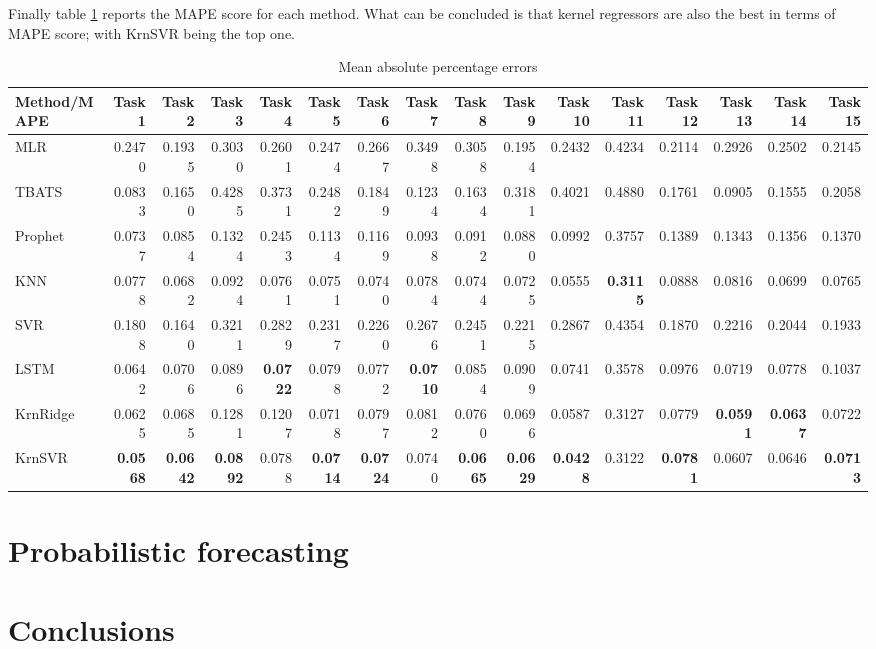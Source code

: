 Finally table \ref{tab:point_MAPE} reports the MAPE score for each method. What can be concluded is that kernel regressors are also the best in terms of MAPE score; with KrnSVR being the top one.
\begin{table}[!ht]
    \caption{Mean absolute percentage errors}
    \label{tab:point_MAPE}
    \begin{adjustbox}{width=\textwidth}
        \begin{tabular}{lrrrrrrrrrrrrrrr}
            \toprule
             Method/MAPE & Task 1 & Task 2 & Task 3 & Task 4 & Task 5 & Task 6 & Task 7 & Task 8 & Task 9 & Task 10 & Task 11 & Task 12 & Task 13 & Task 14 & Task 15 \\
            \midrule
            MLR & 0.2470 & 0.1935 & 0.3030 & 0.2601 & 0.2474 & 0.2667 & 0.3498 & 0.3058 & 0.1954 & 0.2432 & 0.4234 & 0.2114 & 0.2926 & 0.2502 & 0.2145 \\
            TBATS & 0.0833 & 0.1650 & 0.4285 & 0.3731 & 0.2482 & 0.1849 & 0.1234 & 0.1634 & 0.3181 & 0.4021 & 0.4880 & 0.1761 & 0.0905 & 0.1555 & 0.2058 \\
            Prophet & 0.0737 & 0.0854 & 0.1324 & 0.2453 & 0.1134 & 0.1169 & 0.0938 & 0.0912 & 0.0880 & 0.0992 & 0.3757 & 0.1389 & 0.1343 & 0.1356 & 0.1370 \\
            KNN & 0.0778 & 0.0682 & 0.0924 & 0.0761 & 0.0751 & 0.0740 & 0.0784 & 0.0744 & 0.0725 & 0.0555 & \textbf{0.3115} & 0.0888 & 0.0816 & 0.0699 & 0.0765 \\
            SVR & 0.1808 & 0.1640 & 0.3211 & 0.2829 & 0.2317 & 0.2260 & 0.2676 & 0.2451 & 0.2215 & 0.2867 & 0.4354 & 0.1870 & 0.2216 & 0.2044 & 0.1933 \\
            LSTM & 0.0642 & 0.0706 & 0.0896 & \textbf{0.0722} & 0.0798 & 0.0772 & \textbf{0.0710} & 0.0854 & 0.0909 & 0.0741 & 0.3578 & 0.0976 & 0.0719 & 0.0778 & 0.1037 \\
            KrnRidge & 0.0625 & 0.0685 & 0.1281 & 0.1207 & 0.0718 & 0.0797 & 0.0812 & 0.0760 & 0.0696 & 0.0587 & 0.3127 & 0.0779 & \textbf{0.0591} & \textbf{0.0637} & 0.0722 \\
            KrnSVR & \textbf{0.0568} & \textbf{0.0642} & \textbf{0.0892} & 0.0788 & \textbf{0.0714} & \textbf{0.0724} & 0.0740 & \textbf{0.0665} & \textbf{0.0629} & \textbf{0.0428} & 0.3122 & \textbf{0.0781} & 0.0607 & 0.0646 & \textbf{0.0713} \\
            \bottomrule
            \end{tabular}            
    \end{adjustbox}
\end{table}

\section{Probabilistic forecasting}


\section{Conclusions}
